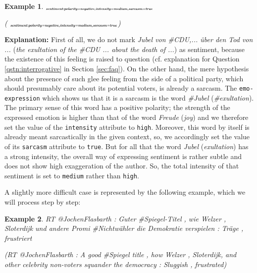 \documentclass[11pt,a4paper]{article}
\theoremstyle{mytheoremstyle}
\newtheorem{exmp}{Example}[section]
\newcommand{\mtag}[2]{{\upshape[\emph{#2}\upshape]$_{\textrm{\bfseries\emph{\tiny
        #1}}}$}}
\newcommand{\sentiment}[2][]{\mtag{sen\-ti\-ment\ifstrempty{#1}{}{:#1}}{#2}}
\newcommand{\target}[2][]{\mtag{tar\-get\ifstrempty{#1}{}{:#1}}{#2}}
\newcommand{\emoexpression}[2][]{\mtag{emo-\-ex\-pression\ifstrempty{#1}{}{:#1}}{#2}}
\begin{document}
\begin{exmp}
  \footnotesize\sentiment[polarity=negative,intensity=medium,sarcasm=true]{Wo
    ist der
    \emoexpression[polarity=positive,intensity=strong,sarcasm=true]{\#Jubel}
    von \target{\#CDU} \target{\#CSU} \& \target{\#FDP} \"uber den Tod
    der Mieterin nach \#Zwangsr\"aumung?}

  {\scriptsize(
    \sentiment[polarity=negative,intensity=medium,sarcasm=true]{Where
      is the
      \emoexpression[polarity=positive,intensity=strong,sarcasm=true]{\#exultation}
      of \target{\#CDU} \target{\#CSU} \& \target{\#FDP} about the
      death of the renter after forced
      \#eviction?})}\label{exmp:sarcasm}
\end{exmp}

\textbf{Explanation:} First of all, we do not mark \textit{Jubel von
  \#CDU,... \"uber den Tod von ...} (\textit{the exultation of the
  \#CDU ... about the death of ...}) as sentiment, because the
existence of this feeling is raised to question (cf. explanation for
Question \ref{qstn:interrogative} in Section \ref{sec:faq}).  On the
other hand, the mere hypothesis about the presence of such glee
feeling from the side of a political party, which should presumably
care about its potential voters, is already a sarcasm.  The
\texttt{emo-expression} which shows us that it is a sarcasm is the
word \textit{\#Jubel} (\textit{\#exultation}).  The primary sense of
this word has a positive polarity; the strength of the expressed
emotion is higher than that of the word \textit{Freude} (\textit{joy})
and we therefore set the value of the \texttt{intensity} attribute to
\texttt{high}.  Moreover, this word by itself is already meant
sarcastically in the given context, so, we accordingly set the value
of its \texttt{sarcasm} attribute to \texttt{true}.  But for all that
the word \textit{Jubel} (\textit{exultation}) has a strong intensity,
the overall way of expressing sentiment is rather subtle and does not
show high exaggeration of the author.  So, the total intensity of
that sentiment is set to \texttt{medium} rather than \texttt{high}.

A slightly more difficult case is represented by the following
example, which we will process step by step:
\begin{exmp}
  \footnotesize RT @JochenFlasbarth : Guter \#Spiegel-Titel , wie
  Welzer , Sloterdijk und andere Promi \#Nichtw\"ahler die Demokratie
  verspielen : Tr\"age , frustriert

  {\scriptsize(RT @JochenFlasbarth : A good \#Spiegel title , how
    Welzer , Sloterdijk, and other celebrity non-voters squander the
    democracy : Sluggish , frustrated)}\label{exmp:nested-2}
\end{exmp}
\end{document}

